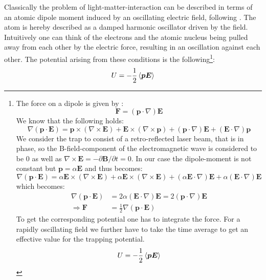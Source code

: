  Classically the problem of light-matter-interaction can be described in terms of an atomic dipole moment induced by an oscillating electric field, following \cite{dipole}. The atom is hereby described as a damped harmonic oscillator driven by the field. Intuitively one can think of the electrons and the atomic nucleus being pulled away from each other by the electric force, resulting in an oscillation against each other. The potential arising from these conditions is the following\footnote{The force on a dipole is given by \cite{factor}:
\begin{equation*}
\boldsymbol{F}=(\boldsymbol{p}\cdot\nabla)\boldsymbol{E}
\end{equation*}
We know that the following holds:
\begin{equation*}
\nabla(\boldsymbol{p}\cdot\boldsymbol{E})=\boldsymbol{p}\times(\nabla\times\boldsymbol{E})+\boldsymbol{E}\times(\nabla\times\boldsymbol{p})+(\boldsymbol{p}\cdot\nabla)\boldsymbol{E}+(\boldsymbol{E}\cdot\nabla)\boldsymbol{p}
\label{dipoleforce}\end{equation*}
We consider the trap to consist of a retro-reflected laser beam, that is in phase, so the B-field-component of the electromagnetic wave is considered to be 0 as well as $\nabla\times\boldsymbol{E}=-\partial\boldsymbol{B}/\partial t=0$. In our case the dipole-moment is not constant but \(\boldsymbol{p}=\alpha \boldsymbol{E}\) and thus becomes:
\begin{equation*}
\nabla(\boldsymbol{p}\cdot\boldsymbol{E})=\alpha\boldsymbol{E}\times(\nabla\times\boldsymbol{E})+\alpha\boldsymbol{E}\times(\nabla\times\boldsymbol{E})+(\alpha\boldsymbol{E}\cdot\nabla)\boldsymbol{E}+\alpha(\boldsymbol{E}\cdot\nabla)\boldsymbol{E}
\end{equation*}
which becomes:
\begin{align*}
\nabla(\boldsymbol{p}\cdot\boldsymbol{E})&=2\alpha(\boldsymbol{E}\cdot\nabla)\boldsymbol{E}=2(\boldsymbol{p}\cdot\nabla)\boldsymbol{E}\\
\Rightarrow \boldsymbol{F}&=\frac{1}{2}\nabla(\boldsymbol{p}\cdot\boldsymbol{E})
\end{align*}
To get the corresponding potential one has to integrate the force. For a rapidly oscillating field we further have to take the time average to get an effective value for the trapping potential.
\begin{equation*}
U=-\frac{1}{2}\left\langle \boldsymbol{p E}\right\rangle
\end{equation*}}:
\begin{equation}
U=-\frac{1}{2}\left\langle \boldsymbol{p E}\right\rangle
\label{dipole}
\end{equation} 
